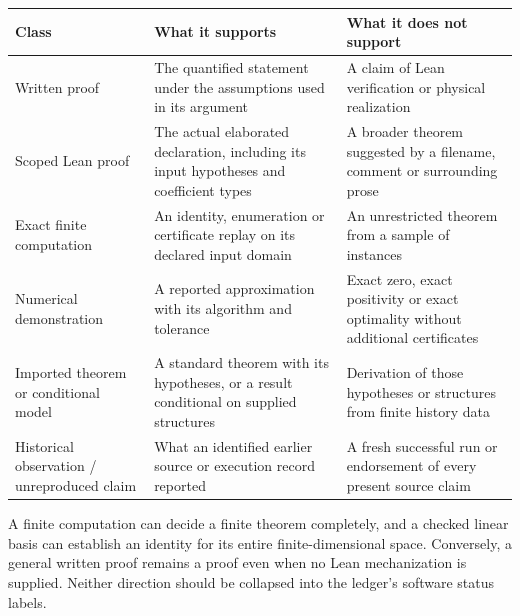 \documentclass[
  11pt,
]{article}
\begin{document}
\begin{longtable}[]{@{}
  >{\raggedright\arraybackslash}p{}
  >{\raggedright\arraybackslash}p{}
  >{\raggedright\arraybackslash}p{}@{}}
\toprule\noalign{}
\begin{minipage}[b]{\linewidth}\raggedright
Class
\end{minipage} & \begin{minipage}[b]{\linewidth}\raggedright
What it supports
\end{minipage} & \begin{minipage}[b]{\linewidth}\raggedright
What it does not support
\end{minipage} \\
\midrule\noalign{}
\endhead
\bottomrule\noalign{}
\endlastfoot
Written proof & The quantified statement under the assumptions used in
its argument & A claim of Lean verification or physical realization \\
Scoped Lean proof & The actual elaborated declaration, including its
input hypotheses and coefficient types & A broader theorem suggested by
a filename, comment or surrounding prose \\
Exact finite computation & An identity, enumeration or certificate
replay on its declared input domain & An unrestricted theorem from a
sample of instances \\
Numerical demonstration & A reported approximation with its algorithm
and tolerance & Exact zero, exact positivity or exact optimality without
additional certificates \\
Imported theorem or conditional model & A standard theorem with its
hypotheses, or a result conditional on supplied structures & Derivation
of those hypotheses or structures from finite history data \\
Historical observation / unreproduced claim & What an identified earlier
source or execution record reported & A fresh successful run or
endorsement of every present source claim \\
\end{longtable}

A finite computation can decide a finite theorem completely, and a
checked linear basis can establish an identity for its entire
finite-dimensional space. Conversely, a general written proof remains a
proof even when no Lean mechanization is supplied. Neither direction
should be collapsed into the ledger's software status labels.
\end{document}
